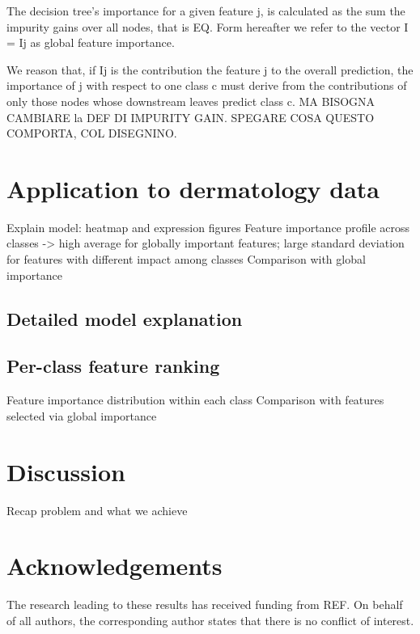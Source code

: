 \documentclass[12pt,a4paper]{article}
\theoremstyle{definition}
\theoremstyle{plain}
\theoremstyle{remark}
\begin{document}
The decision tree's importance for a given feature j, is calculated as the sum the impurity gains over all nodes, that is
EQ.
Form hereafter we refer to the vector I = Ij as global feature importance. 

We reason that, if Ij is the contribution the feature j to the overall prediction, the importance of j with respect to one class c must derive from the contributions of only those nodes whose downstream leaves predict class c.
MA BISOGNA CAMBIARE la DEF DI IMPURITY GAIN.
SPEGARE COSA QUESTO COMPORTA, COL DISEGNINO.
  


\section{Application to dermatology data}\label{sec:matrix_rank}

Explain model: heatmap and expression figures
Feature importance profile across classes -> high average for globally important features; large standard deviation for features with different impact among classes
Comparison with global importance

\subsection{Detailed model explanation}\label{subsec:explanability}

\subsection{Per-class feature ranking}\label{subsec:feature_selection}
Feature importance distribution within each class
Comparison with features selected via global importance

\section{Discussion}\label{sec:discussion}
Recap problem and what we achieve

\section*{Acknowledgements}
The research leading to these results has received funding from REF.
On behalf of all authors, the corresponding author states that there is no conflict of interest.


\end{document}
